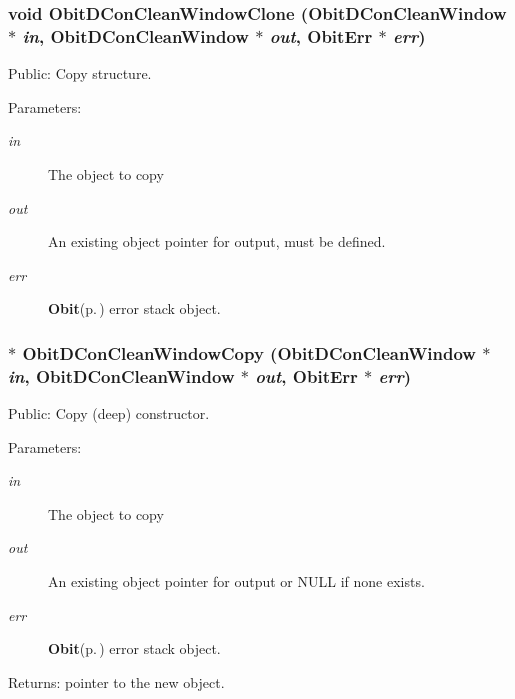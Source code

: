 \subsubsection{\setlength{\rightskip}{0pt plus 5cm}void Obit\-DCon\-Clean\-Window\-Clone ({\bf Obit\-DCon\-Clean\-Window} $\ast$ {\em in}, {\bf Obit\-DCon\-Clean\-Window} $\ast$ {\em out}, {\bf Obit\-Err} $\ast$ {\em err})}\label{ObitDConCleanWindow_8h_a31}


Public: Copy structure. 

\begin{Desc}
\item[Parameters:]
\begin{description}
\item[{\em in}]The object to copy \item[{\em out}]An existing object pointer for output, must be defined. \item[{\em err}]{\bf Obit}{\rm (p.\,\pageref{structObit})} error stack object. \end{description}
\end{Desc}
\subsubsection{$\ast$ Obit\-DCon\-Clean\-Window\-Copy ({\bf Obit\-DCon\-Clean\-Window} $\ast$ {\em in}, {\bf Obit\-DCon\-Clean\-Window} $\ast$ {\em out}, {\bf Obit\-Err} $\ast$ {\em err})}\label{ObitDConCleanWindow_8h_a30}


Public: Copy (deep) constructor. 

\begin{Desc}
\item[Parameters:]
\begin{description}
\item[{\em in}]The object to copy \item[{\em out}]An existing object pointer for output or NULL if none exists. \item[{\em err}]{\bf Obit}{\rm (p.\,\pageref{structObit})} error stack object. \end{description}
\end{Desc}
\begin{Desc}
\item[Returns:]pointer to the new object. \end{Desc}
